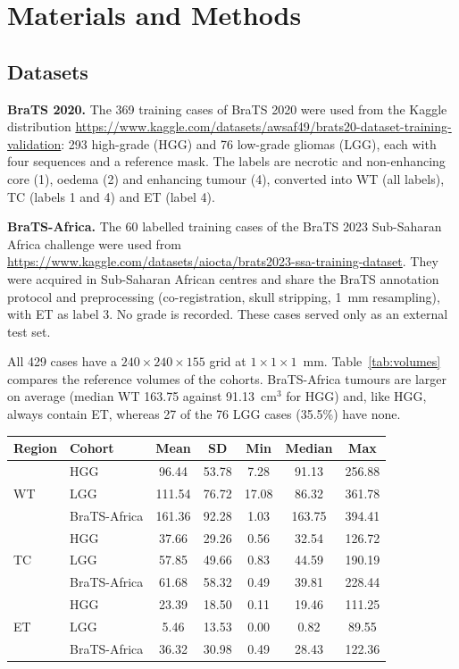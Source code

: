 \documentclass[a4paper,fleqn]{cas-sc}
\begin{document}
\section{Materials and Methods}
\label{sec:methods}

\subsection{Datasets}
\label{sec:data}

\textbf{BraTS 2020.} The 369 training cases of BraTS 2020 \citep{menze2015,bakas2017} were used from the Kaggle distribution \url{https://www.kaggle.com/datasets/awsaf49/brats20-dataset-training-validation}: 293 high-grade (HGG) and 76 low-grade gliomas (LGG), each with four sequences and a reference mask. The labels are necrotic and non-enhancing core (1), oedema (2) and enhancing tumour (4), converted into WT (all labels), TC (labels 1 and 4) and ET (label 4).

\textbf{BraTS-Africa.} The 60 labelled training cases of the BraTS 2023 Sub-Saharan Africa challenge \citep{adewole2025} were used from \url{https://www.kaggle.com/datasets/aiocta/brats2023-ssa-training-dataset}. They were acquired in Sub-Saharan African centres and share the BraTS annotation protocol and preprocessing (co-registration, skull stripping, 1~mm resampling), with ET as label 3. No grade is recorded. These cases served only as an external test set.

All 429 cases have a $240\times 240\times 155$ grid at $1\times 1\times 1$~mm. Table~\ref{tab:volumes} compares the reference volumes of the cohorts. BraTS-Africa tumours are larger on average (median WT 163.75 against 91.13~cm$^3$ for HGG) and, like HGG, always contain ET, whereas 27 of the 76 LGG cases (35.5\%) have none.

\begin{heretable}
\centering
\caption{Reference region volumes in cm$^3$ by cohort (293 BraTS 2020 HGG, 76 BraTS 2020 LGG and 60 BraTS-Africa cases).}
\label{tab:volumes}
\small
\begin{tabular*}{\textwidth}{@{\extracolsep{\fill}}llccccc@{}}
\toprule
Region & Cohort & Mean & SD & Min & Median & Max \\
\midrule
\multirow{3}{*}{WT} & HGG & 96.44 & 53.78 & 7.28 & 91.13 & 256.88 \\
 & LGG & 111.54 & 76.72 & 17.08 & 86.32 & 361.78 \\
 & BraTS-Africa & 161.36 & 92.28 & 1.03 & 163.75 & 394.41 \\
\multirow{3}{*}{TC} & HGG & 37.66 & 29.26 & 0.56 & 32.54 & 126.72 \\
 & LGG & 57.85 & 49.66 & 0.83 & 44.59 & 190.19 \\
 & BraTS-Africa & 61.68 & 58.32 & 0.49 & 39.81 & 228.44 \\
\multirow{3}{*}{ET} & HGG & 23.39 & 18.50 & 0.11 & 19.46 & 111.25 \\
 & LGG & 5.46 & 13.53 & 0.00 & 0.82 & 89.55 \\
 & BraTS-Africa & 36.32 & 30.98 & 0.49 & 28.43 & 122.36 \\
\bottomrule
\end{tabular*}
\end{heretable}
\end{document}
